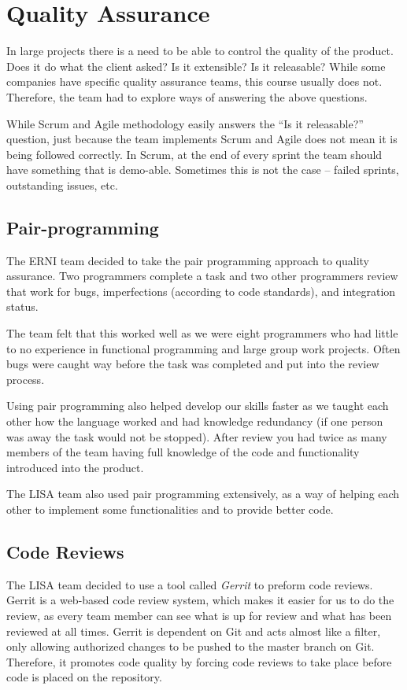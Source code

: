 \section {Quality Assurance}
In large projects there is a need to be able to control the quality of the product. Does it do what the client asked? Is it extensible? Is it releasable? While some companies have specific quality assurance teams, this  course usually does not. Therefore, the team had to explore ways of answering the above questions.

While Scrum and Agile methodology easily answers the ``Is it releasable?'' question, just because the team  implements Scrum and Agile does not mean it is being followed correctly. In Scrum, at the end of every sprint the team should have something that is demo-able. Sometimes this is not the case -- failed sprints, outstanding issues, etc.

\subsection{Pair-programming}

The ERNI team decided to take the pair programming approach to quality assurance. Two programmers complete a task and two other programmers review that work for bugs, imperfections (according to code standards), and integration status. 

The team felt that this worked well as we were eight programmers who had little to no experience in functional programming and large group work projects. Often bugs were caught way before the task was completed and put into the review process. 

Using pair programming also helped develop our skills faster as we taught each other how the language worked and had knowledge redundancy (if one person was away the task would not be stopped). After review you had twice as many members of the team having full knowledge of the code and functionality introduced into the product.

The LISA team also used pair programming extensively, as a way of helping each other to implement some functionalities and to provide better code.

\subsection{Code Reviews}

The LISA team decided to use a tool called \textit{Gerrit} to preform code reviews. Gerrit is a web-based code review system, which makes it easier for us to do the review, as every team member can see what is up for review and what has been reviewed at all times. Gerrit is dependent on Git and acts almost like a filter, only allowing authorized changes to be pushed to the master branch on Git. Therefore, it promotes code quality by forcing code reviews to take place before code is placed on the repository.

